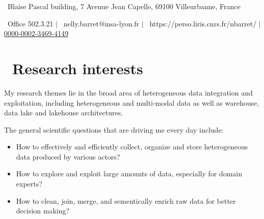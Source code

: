 \documentclass{article}
\begin{document}



\noindent \faMapMarker\ Blaise Pascal building, 7 Avenue Jean Capelle, 69100 Villeurbanne, France

\noindent \faBuilding\ Office 502.3.21 $|$ \faEnvelope\ nelly.barret@insa-lyon.fr $|$ \faLaptop\ https://perso.liris.cnrs.fr/nbarret/ $|$  \href{https://orcid.org/0000-0002-3469-4149}{0000-0002-3469-4149}

\section*{\faHeart\ Research interests}
\noindent My research themes lie in the broad area of heterogeneous data integration and exploitation, including heterogeneous and multi-modal data as well as warehouse, data lake and lakehouse architectures.

\noindent The general scientific questions that are driving me every day include:

	\begin{itemize}

		\item How to effectively and efficiently collect, organize and store heterogeneous data produced by various actors?

		\item How to explore and exploit large amounts of data, especially for domain experts?

		\item How to clean, join, merge, and sementically enrich raw data for better decision making?

	\end{itemize}
\end{document}
